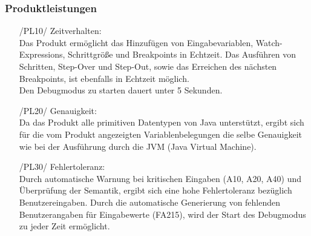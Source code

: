 \documentclass[parskip=full]{scrartcl}
\begin{document}
		\subsubsection{Produktleistungen}
		\begin{itemize}
		\item[/PL10/] Zeitverhalten: \\
		Das Produkt ermöglicht das Hinzufügen von Eingabevariablen, Watch-Expressions, Schrittgröße und Breakpoints in Echtzeit. Das Ausführen von Schritten, Step-Over und Step-Out, sowie das Erreichen des nächsten Breakpoints, ist ebenfalls in Echtzeit möglich. \\
		Den Debugmodus zu starten dauert unter 5 Sekunden. 
		\item[/PL20/] Genauigkeit: \\
		Da das Produkt alle primitiven Datentypen von Java unterstützt, ergibt sich für die vom Produkt angezeigten Variablenbelegungen die selbe Genauigkeit wie bei der Ausführung durch die JVM (Java Virtual Machine).
		\newpage
		\item[/PL30/] Fehlertoleranz: \\
		Durch automatische Warnung bei kritischen Eingaben (A10, A20, A40) und Überprüfung der Semantik, ergibt sich eine hohe Fehlertoleranz bezüglich Benutzereingaben.
		Durch die automatische Generierung von fehlenden Benutzerangaben für Eingabewerte (FA215), wird der Start des Debugmodus zu jeder Zeit ermöglicht.
		\end{itemize}
		
\end{document}
